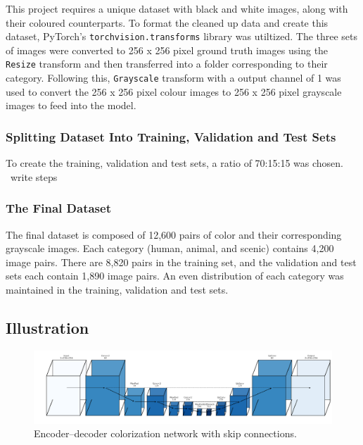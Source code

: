 \documentclass{article} %
\begin{document}
This project requires a unique dataset with black and white images, along with their coloured counterparts. To format the cleaned up data and create this dataset, PyTorch’s \verb|torchvision.transforms| library was utiltized. The three sets of images were converted to 256 x 256 pixel ground truth images using the \verb|Resize| transform and then transferred into a folder corresponding to their category. Following this, \verb|Grayscale|
 transform with a output channel of 1 was used to convert the 256 x 256 pixel colour images to 256 x 256 pixel grayscale images to feed into the model. 

 \subsubsection{Splitting Dataset Into Training, Validation and Test Sets}

To create the training, validation and test sets, a ratio of 70:15:15 was chosen. ~write steps 

\subsubsection{The Final Dataset}

The final dataset is composed of 12,600 pairs of color and their corresponding grayscale images. Each category (human, animal, and scenic) contains 4,200 image pairs. There are 8,820 pairs in the training set, and the validation and test sets each contain 1,890 image pairs. An even distribution of each category was maintained in the training, validation and test sets.

\subsection{Illustration}

\begin{figure}[htbp]            %
  \centering
  \includegraphics[width=0.9\linewidth]{Figs/architecture.png}
  \caption{Encoder–decoder colorization network with skip connections.}
  \label{fig:architecture}
\end{figure}
\end{document}
